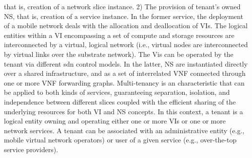 \documentclass{article}
\begin{document}
that is, creation of a network slice instance.
2) The provision of tenant's owned \gls{NS}, that is, creation of a service instance.
In the former service, the deployment of a mobile network deals with the
allocation and deallocation of VIs. The logical entities within a VI encompassing
a set of compute and storage resources are interconnected by a virtual, logical
network (i.e., virtual nodes are interconnected by virtual links over the substrate
network). The Vis can be operated by the tenant via different \gls{sdn} control
models. In the latter, NS are instantiated directly over a shared infrastructure,
and as a set of interrelated \gls{VNF} connected through
one or more VNF forwarding graphs.
Multi-tenancy is an characteristic that can be applied to both
kinds of services, guaranteeing separation, isolation, and independence between
different slices coupled with the efficient sharing of the underlying resources
for both VI and NS concepts. In this context, a tenant is a logical entity owning and operating either one or more VIs or one or more network services. A tenant can be associated with an administrative entity (e.g., mobile virtual network operators) or
user of a given service (e.g., over-the-top service providers).


\newpage
\end{document}
